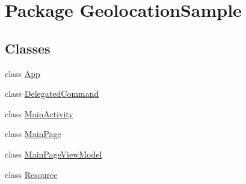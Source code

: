 \hypertarget{namespace_geolocation_sample}{\section{Package Geolocation\+Sample}
\label{namespace_geolocation_sample}
}
\subsection*{Classes}
\begin{DoxyCompactItemize}
\item 
class \hyperlink{class_geolocation_sample_1_1_app}{App}
\item 
class \hyperlink{class_geolocation_sample_1_1_delegated_command}{Delegated\+Command}
\item 
class \hyperlink{class_geolocation_sample_1_1_main_activity}{Main\+Activity}
\item 
class \hyperlink{class_geolocation_sample_1_1_main_page}{Main\+Page}
\item 
class \hyperlink{class_geolocation_sample_1_1_main_page_view_model}{Main\+Page\+View\+Model}
\item 
class \hyperlink{class_geolocation_sample_1_1_resource}{Resource}
\end{DoxyCompactItemize}
